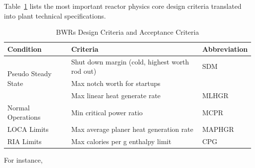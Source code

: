 \documentclass{school-22.211-notes}
\begin{document}
Table~\ref{BWRs-criteria} lists the most important reactor physics core design criteria translated into plant technical specifications.
\begin{table}[ht]
  \begin{tabular}{|l|l|l|} \hline
    Condition & Criteria & Abbreviation \\ \hline
    \multirow{3}{*}{Pseudo Steady State} & Shut down margin (cold, highest worth rod out)  & SDM \\ 
    & Max notch worth for startups &  \\
    & Max linear heat generate rate & MLHGR \\ \hline
    Normal Operations & Min critical power ratio & MCPR \\ \hline
    LOCA Limits & Max average planer heat generation rate & MAPHGR \\ \hline
    RIA Limits & Max calories per g enthalpy limit & CPG \\ \hline
  \end{tabular}
  \caption{BWRs Design Criteria and Acceptance Criteria} \label{BWRs-criteria}
\end{table}
For instance, 
\end{document}
